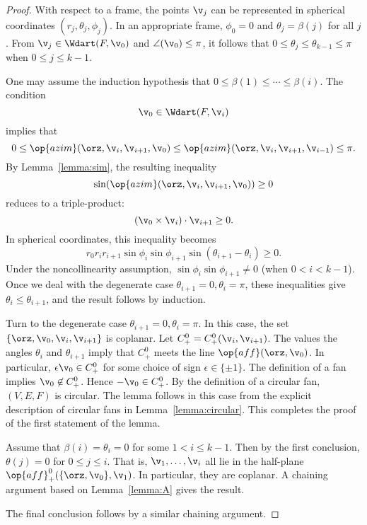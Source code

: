 \begin{proof}  
  With respect to a frame, the points $\v_j$ can be represented in
  spherical coordinates $(r_j,\theta_j,\phi_j)$.  In an appropriate
  frame, $\phi_0=0$ and $\theta_j=\beta(j)$ for all $j$.  From
  $\v_j\in \Wdart(F,\v_0)$ and $\angle(\v_0)\le\pi$, it follows that
  $0\le\theta_j\le\theta_{k-1}\le\pi$ when $0\le j\le k-1$.

One may assume the induction hypothesis that $0\le \beta(1)\le\cdots\le
\beta(i)$.  The condition
\[ 
\v_0\in \Wdart(F,\v_i)
\] 
implies that
\[ 
  0 \le \op{azim}(\orz,\v_i,\v_{i+1},\v_0)
\le \op{azim}(\orz,\v_i,\v_{i+1},\v_{i-1})\le\pi.
\] 
By Lemma~\ref{lemma:sim}, the resulting inequality
\[ 
\sin(\op{azim}(\orz,\v_i,\v_{i+1},\v_0))\ge 0
\] 
reduces to a triple-product:
\[ 
(\v_0 \times \v_i)\cdot \v_{i+1}\ge 0.
\] 
In spherical coordinates, this inequality becomes
\begin{equation}\label{eqn:triple-product}
r_0r_ir_{i+1}\sin\phi_i\sin\phi_{i+1}\sin(\theta_{i+1}-\theta_i)\ge0.
\end{equation}
Under the noncollinearity assumption, $\sin\phi_i\sin\phi_{i+1}\ne0$
(when $0< i < k-1$).  Once we deal with the degenerate
case $\theta_{i+1}=0,\theta_i=\pi$, these inequalities give
$\theta_i\le \theta_{i+1}$, and the result follows by induction.

Turn to the degenerate case $\theta_{i+1}=0,\theta_i=\pi$.  In this case,
the set $\{\orz,\v_0,\v_i,\v_{i+1}\}$ is coplanar.  Let $C^0_+=C^0_+(\v_i,\v_{i+1})$. 
The values the angles $\theta_i$ and $\theta_{i+1}$
imply that $C^0_+$ meets
the line $\op{aff}(\orz,\v_0)$. In particular, $\epsilon \v_0\in C^0_+$
for some choice of sign $\epsilon\in\{\pm 1\}$.
 The definition of a fan implies
$\v_0\not\in C^0_+$. Hence $-\v_0\in C^0_+$.
By the definition of a circular fan, $(V,E,F)$ is circular.
The lemma follows in this case from the explicit description of circular
fans in Lemma~\ref{lemma:circular}.  This completes the proof of the first
statement of the lemma.

Assume that $\beta(i)=\theta_i=0$ for some $1<i\le k-1$.  Then by the first
conclusion, $\theta(j)=0$ for $0\le j\le i$.  That is, 
$\v_1,\ldots,\v_i$ all lie in the half-plane
$\op{aff}^0_+(\{\orz,\v_0\},\v_1)$.  In particular, they are coplanar.
A chaining argument based on Lemma~\ref{lemma:A} gives the result.

The final conclusion follows by a similar chaining argument.
\end{proof}


